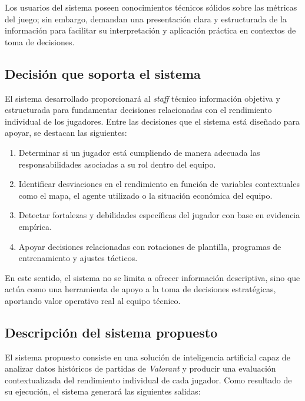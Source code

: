 \documentclass{ULBreport} %
\begin{document}
Los usuarios del sistema poseen conocimientos técnicos sólidos sobre las métricas del juego; sin embargo, demandan una presentación clara y estructurada de la información para facilitar su interpretación y aplicación práctica en contextos de toma de decisiones.

\subsection{Decisión que soporta el sistema}

El sistema desarrollado proporcionará al \textit{staff} técnico información objetiva y estructurada para fundamentar decisiones relacionadas con el rendimiento individual de los jugadores. Entre las decisiones que el sistema está diseñado para apoyar, se destacan las siguientes:

\begin{enumerate}
    \item Determinar si un jugador está cumpliendo de manera adecuada las responsabilidades asociadas a su rol dentro del equipo.
    \item Identificar desviaciones en el rendimiento en función de variables contextuales como el mapa, el agente utilizado o la situación económica del equipo.
    \item Detectar fortalezas y debilidades específicas del jugador con base en evidencia empírica.
    \item Apoyar decisiones relacionadas con rotaciones de plantilla, programas de entrenamiento y ajustes tácticos.
\end{enumerate}

En este sentido, el sistema no se limita a ofrecer información descriptiva, sino que actúa como una herramienta de apoyo a la toma de decisiones estratégicas, aportando valor operativo real al equipo técnico.

\subsection{Descripción del sistema propuesto}

El sistema propuesto consiste en una solución de inteligencia artificial capaz de analizar datos históricos de partidas de \textit{Valorant} y producir una evaluación contextualizada del rendimiento individual de cada jugador. Como resultado de su ejecución, el sistema generará las siguientes salidas:
\end{document}
